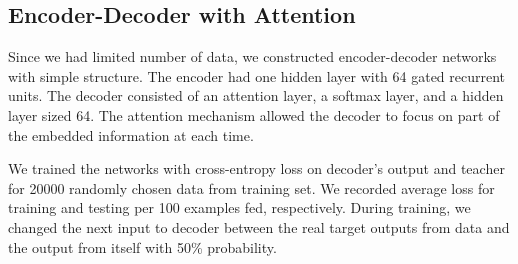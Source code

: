 \documentclass{article}
\begin{document}
\subsection{Encoder-Decoder with Attention}
Since we had limited number of data, we constructed encoder-decoder networks with simple structure. The encoder had one hidden layer with 64 gated recurrent units. The decoder consisted of an attention layer, a softmax layer, and a hidden layer sized 64. The attention mechanism allowed the decoder to focus on part of the embedded information at each time. \par 
We trained the networks with cross-entropy loss on decoder's output and teacher for 20000 randomly chosen data from training set. We recorded average loss for training and testing per 100 examples fed, respectively. During training, we changed the next input to decoder between the real target outputs from data and the output from itself with 50\% probability. 
%
%
\end{document}
